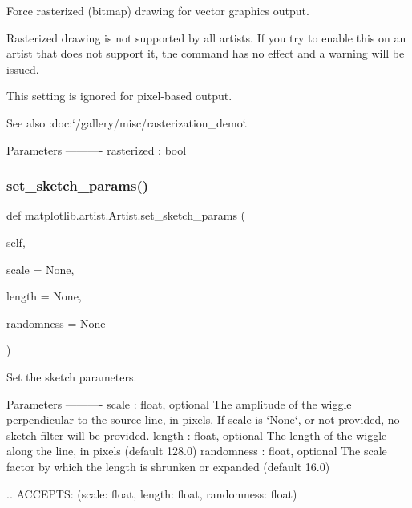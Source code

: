 \begin{DoxyVerb}Force rasterized (bitmap) drawing for vector graphics output.

Rasterized drawing is not supported by all artists. If you try to
enable this on an artist that does not support it, the command has no
effect and a warning will be issued.

This setting is ignored for pixel-based output.

See also :doc:`/gallery/misc/rasterization_demo`.

Parameters
----------
rasterized : bool
\end{DoxyVerb}
 \mbox{\label{classmatplotlib_1_1artist_1_1Artist_a0ba09d3b354380182d95585803a8042d}} 
\subsubsection{\texorpdfstring{set\+\_\+sketch\+\_\+params()}{set\_sketch\_params()}}
{\footnotesize\ttfamily def matplotlib.\+artist.\+Artist.\+set\+\_\+sketch\+\_\+params (\begin{DoxyParamCaption}\item[{}]{self,  }\item[{}]{scale = {\ttfamily None},  }\item[{}]{length = {\ttfamily None},  }\item[{}]{randomness = {\ttfamily None} }\end{DoxyParamCaption})}

\begin{DoxyVerb}Set the sketch parameters.

Parameters
----------
scale : float, optional
    The amplitude of the wiggle perpendicular to the source
    line, in pixels.  If scale is `None`, or not provided, no
    sketch filter will be provided.
length : float, optional
     The length of the wiggle along the line, in pixels
     (default 128.0)
randomness : float, optional
    The scale factor by which the length is shrunken or
    expanded (default 16.0)

    .. ACCEPTS: (scale: float, length: float, randomness: float)
\end{DoxyVerb}
 \mbox{\label{classmatplotlib_1_1artist_1_1Artist_a33a0c3664686bd82867ea9081fb50dd3}} 
